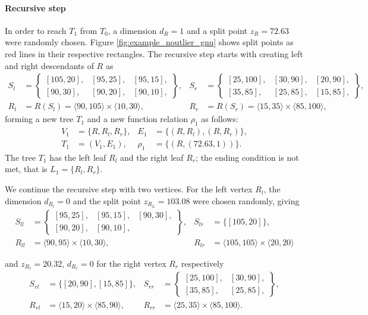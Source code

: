 \begin{example}
\paragraph{Recursive step} 
In order to reach $T_1$ from $T_0$, a dimension $d_R=1$ and a split point $z_R = 72.63$ were randomly chosen. Figure \ref{fig:example_noutlier_gnu} shows split points as red lines in their respective rectangles. The recursive step starts with creating left and right descendants of $R$ as
\begin{align*}
 S_l & = \left\{\begin{smallmatrix}
 [105,20],& [95,25], &[95,15],\\
[90,30],&[90,20],&[90,10],
\end{smallmatrix}\right\},&
S_r &= \left\{\begin{smallmatrix}
    [25,100],&[30,90],&[20,90],\\
    [35,85], &[25,85],&[15,85],
\end{smallmatrix}\right\},\\
R_l &= R(S_l) = \langle 90, 105 \rangle \times \langle 10, 30 \rangle,&
R_r &= R(S_r) = \langle 15, 35 \rangle \times \langle 85, 100 \rangle,
\end{align*}
forming a new tree $T_1$ and a new function relation $\rho_1$ as follows:
\begin{align*}
V_1 &= \{R, R_l, R_r\},&
E_1 &= \{(R,R_l), (R,R_r)\},\\
T_1 &= (V_1, E_1),&
\rho_1 &= \{ (R, (72.63, 1))\}.
\end{align*}
The tree $T_1$ has the left leaf $R_l$ and the right leaf $R_r$; the ending condition is not met, that is $L_1 = \{R_l,R_r\}$. 

We continue the recursive step with two vertices.
For the left vertex $R_l$, the dimension $d_{R_l} =0$ and the split point $z_{R_L}= 103.08$ were chosen randomly, giving
\begin{align*}
S_{ll} &= \left\{\begin{smallmatrix}
    [95,25],& [95,15], &[90,30],\\
    [90,20],& [90,10],
\end{smallmatrix}\right\},&
S_{lr} &= \{[105,20]\},\\
R_{ll} &= \langle 90, 95 \rangle \times \langle 10, 30\rangle,&
R_{lr} &= \langle 105, 105 \rangle \times \langle 20, 20\rangle
\end{align*}

and $z_{R_r}= 20.32$, $d_{R_r} = 0$ for the right vertex $R_r$ respectively
\begin{align*}
S_{rl}&= \{[20,90],[15,85]\},&
S_{rr} &= \left\{\begin{smallmatrix}
    [25, 100],& [30,90],\\
    [35,85],& [25,85],
\end{smallmatrix}\right\},\\
R_{rl}&= \langle 15, 20 \rangle \times \langle 85, 90 \rangle,&
R_{rr}&= \langle 25, 35 \rangle \times \langle 85, 100 \rangle.
\end{align*}


\end{example}
